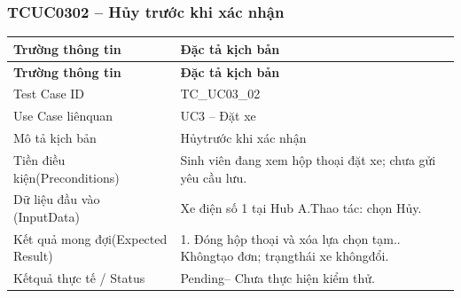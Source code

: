 \subsubsection{TCUC0302 – Hủy trước khi xác nhận}
\begin{longtable}{|L{0.24\textwidth}|L{0.70\textwidth}|}
\hline
\textbf{Trường thông tin} & \textbf{Đặc tả kịch bản} \\
\hline
\endfirsthead
\hline
\textbf{Trường thông tin} & \textbf{Đặc tả kịch bản} \\
\hline
\endhead
Test Case ID & TC\_UC03\_02 \\
\hline
Use Case liênquan & UC3 – Đặt xe \\
\hline
Mô tả kịch bản & Hủytrước khi xác nhận \\
\hline
Tiền điều kiện\newline (Preconditions) & Sinh viên đang xem hộp thoại đặt xe; chưa gửi yêu cầu lưu. \\
\hline
Dữ liệu đầu vào (Input\newline Data) & Xe điện số 1 tại Hub A.\newline Thao tác: chọn Hủy. \\
\hline
Kết quả mong đợi\newline (Expected Result) & 1. Đóng hộp thoại và xóa lựa chọn tạm.. Khôngtạo đơn; trạngthái xe khôngđổi. \\
\hline
Kếtquả thực tế / Status & Pending– Chưa thực hiện kiểm thử. \\
\hline
\end{longtable}
\vspace{-0.5\baselineskip}
